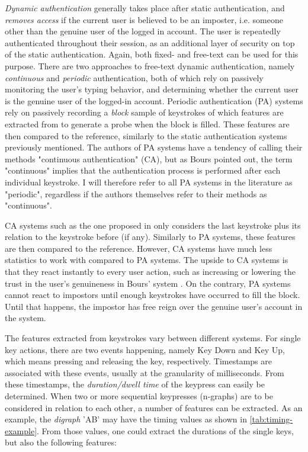 \documentclass[informationsecurity]{gucmasterproject}
\begin{document}
\textit{Dynamic authentication} generally takes place after static authentication, and \textit{removes access} if the current user is believed to be an imposter, i.e. someone other than the genuine user of the logged in account.
The user is repeatedly authenticated throughout their session, as an additional layer of security on top of the static authentication.
Again, both fixed- and free-text can be used for this purpose.
There are two approaches to free-text dynamic authentication, namely \textit{continuous} and \textit{periodic} authentication, both of which rely on passively monitoring the user's typing behavior, and determining whether the current user is the genuine user of the logged-in account.
Periodic authentication (PA) systems rely on passively recording a \textit{block} sample of keystrokes of which features are extracted from to generate a probe when the block is filled.
These features are then compared to the reference, similarly to the static authentication systems previously mentioned.
The authors of PA systems have a tendency of calling their methods "continuous authentication" (CA), but as Bours \cite{BOURS201236} pointed out, the term "continuous" implies that the authentication process is performed after each individual keystroke.
I will therefore refer to all PA systems in the literature as "periodic", regardless if the authors themselves refer to their methods as "continuous".

CA systems such as the one proposed in \cite{BOURS201236} only considers the last keystroke plus its relation to the keystroke before (if any).
Similarly to PA systems, these features are then compared to the reference. 
However, CA systems have much less statistics to work with compared to PA systems.
The upside to CA systems is that they react instantly to every user action, such as increasing or lowering the trust in the user's genuineness in Bours' system \cite{BOURS201236}.
On the contrary, PA systems cannot react to impostors until enough keystrokes have occurred to fill the block.
Until that happens, the impostor has free reign over the genuine user's account in the system.

The features extracted from keystrokes vary between different systems.
For single key actions, there are two events happening, namely Key Down and Key Up, which means pressing and releasing the key, respectively.
Timestamps are associated with these events, usually at the granularity of milliseconds.
From these timestamps, the \textit{duration/dwell time} of the keypress can easily be determined.
When two or more sequential keypresses (n-graphs) are to be considered in relation to each other, a number of features can be extracted.
As an example, the \textit{digraph} 'AB' may have the timing values as shown in \cref{tab:timing-example}.
From those values, one could extract the durations of the single keys, but also the following features: 
\end{document}
